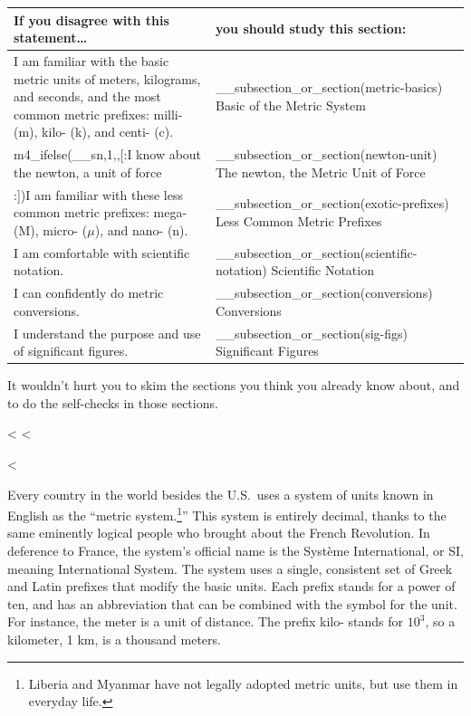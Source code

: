 \noindent\begin{tabular}{|p{60mm}|p{60mm}|}
\hline
\textbf{If you disagree with this statement\ldots} & \textbf{you should study this section:}\\
\hline
I am familiar with the basic metric units of meters, kilograms, and seconds, and the most
common metric prefixes: milli- (m), kilo- (k), and centi- (c). & __subsection_or_section(metric-basics) Basic of the Metric System \\
\hline
m4_ifelse(__sn,1,,[:I know about the newton, a unit of force & __subsection_or_section(newton-unit) The newton, the Metric Unit of Force\\
\hline
:])I am familiar with these less common metric prefixes: mega- (M), micro- ($\mu$), and nano- (n). &
__subsection_or_section(exotic-prefixes) Less Common Metric Prefixes \\
\hline
I am comfortable with scientific notation. & __subsection_or_section(scientific-notation) Scientific Notation \\
\hline
I can confidently do metric conversions. & __subsection_or_section(conversions) Conversions \\
\hline
I understand the purpose and use of significant figures. & __subsection_or_section(sig-figs) Significant Figures \\
\hline
\end{tabular}

\noindent It wouldn't hurt you to skim the sections you think you
already know about, and to do the self-checks in those sections.

<%
<%

<%

Every country in the world besides the U.S.~uses a
system of units known in English as the ``metric system.\footnote{Liberia and Myanmar have not legally adopted metric units, but use them
in everyday life.}''
This system is entirely decimal, thanks to the same
eminently logical people who brought about the French Revolution. In deference to France, the
system's official name is the Syst\`{e}me International, or SI,
meaning International System.
The system uses a
single, consistent set of Greek and Latin prefixes
that modify the basic units. Each
prefix stands for a power of ten, and has an abbreviation
that can be combined with the symbol for the unit. For
instance, the meter is a unit of distance. The prefix kilo-
stands for $10^3$, so a kilometer, 1 km, is a thousand meters.

